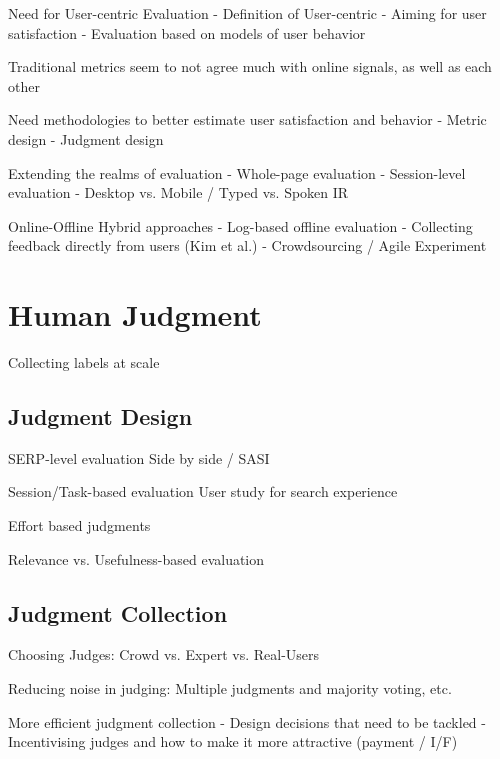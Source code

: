 \documentclass[openany]{now} %
\begin{document}
Need for User-centric Evaluation
- Definition of User-centric
- Aiming for user satisfaction
- Evaluation based on models of user behavior

Traditional metrics seem to not agree much with online signals, as well as each other
\cite{radl:comp10}


Need methodologies to better estimate user satisfaction and behavior
-	Metric design
-	Judgment design


Extending the realms of evaluation
-	Whole-page evaluation
-	Session-level evaluation
-	Desktop vs. Mobile / Typed vs. Spoken IR
\cite{Bailey2010} \cite{Thomas2006} \cite{CarteretteBCD08}

Online-Offline Hybrid approaches
- Log-based offline evaluation \cite{Li:2015} \cite{li2010contextual}
- Collecting feedback directly from users (Kim et al.)
- Crowdsourcing / Agile Experiment

\chapter{Human Judgment}
Collecting labels at scale

\section{Judgment Design}

SERP-level evaluation 
Side by side / SASI
\cite{Thomas2006}
\cite{Chandar2013} \cite{Al-Maskari2007} 
\cite{Bailey2010} \cite{CarteretteBCD08}

Session/Task-based evaluation
User study for search experience

Effort based judgments \cite{Yilmaz:2014}

Relevance vs. Usefulness-based evaluation 

\section{Judgment Collection}

Choosing Judges: 
Crowd vs. Expert vs. Real-Users \cite{Scholer:2013} \cite{Kazai:2013} \cite{Alonso20121053}

Reducing noise in judging: 
Multiple judgments and majority voting, etc. \cite{Venanzi:2014}

More efficient judgment collection
-	Design decisions that need to be tackled  \cite{Blanco:2011} \cite{Kazai2012} \cite{Alonso2012} \cite{Alonso:2015}
-	Incentivising judges and how to make it more attractive (payment / I/F)
\cite{Megorskaya2015} \cite{Davtyan2015}  \cite{Rokicki:2014}  \cite{Eickhoff:2012}
\end{document}
